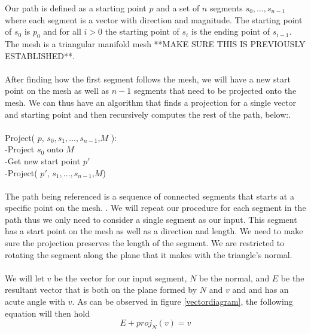 \documentclass[conference]{acmsiggraph}
\begin{document}
Our path is defined as a starting point $p$ and a set of $n$ segments $s_0,...,s_{n-1}$ where each segment is a vector with direction and magnitude. The starting point of $s_0$ is $p_0$ and for all $i>0$ the starting point of $s_i$ is the ending point of $s_{i-1}$. The mesh is a triangular manifold mesh **MAKE SURE THIS IS PREVIOUSLY ESTABLISHED**. \\
\\
After finding how the first segment follows the mesh, we will have a new start point on the mesh as well as $n-1$ segments that need to be projected onto the mesh. We can thus have an algorithm that finds a projection for a single vector and starting point and then recursively computes the rest of the path, below:.\\
\\
Project( $p$, ${s_0,s_1,...,s_{n-1}}$,$M$ ):\\
-Project $s_0$ onto $M$\\
-Get new start point $p'$\\
-Project( $p'$, ${s_1,...,s_{n-1}}$,$M$)\\ 
\\
The path being referenced is a sequence of connected segments that starts at a specific point on the mesh. . We will repeat our procedure for each segment in the path thus we only need to consider a single segment as our input. This segment has a start point on the mesh as well as a direction and length. We need to make sure the projection preserves the length of the segment. We are restricted to rotating the segment along the plane that it makes with the triangle's normal. \\
\\
We will let $v$ be the vector for our input segment, $N$ be the normal, and $E$ be the resultant vector that is both on the plane formed by $N$ and $v$ and and has an acute angle with $v$. As can be observed in figure \ref{vectordiagram}, the following equation will then hold
\[
E + proj_N(v) = v
\]
\end{document}

